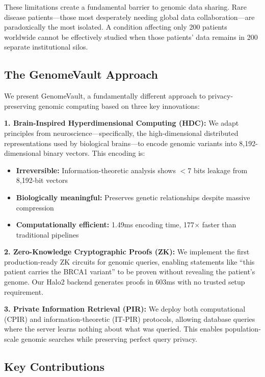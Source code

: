 \documentclass[11pt,a4paper]{article}
\begin{document}
These limitations create a fundamental barrier to genomic data sharing. Rare disease patients—those most desperately needing global data collaboration—are paradoxically the most isolated. A condition affecting only 200 patients worldwide cannot be effectively studied when those patients' data remains in 200 separate institutional silos.

\subsection{The GenomeVault Approach}

We present GenomeVault, a fundamentally different approach to privacy-preserving genomic computing based on three key innovations:

\textbf{1. Brain-Inspired Hyperdimensional Computing (HDC):} We adapt principles from neuroscience—specifically, the high-dimensional distributed representations used by biological brains—to encode genomic variants into 8,192-dimensional binary vectors. This encoding is:
\begin{itemize}
    \item \textbf{Irreversible:} Information-theoretic analysis shows $<$7 bits leakage from 8,192-bit vectors
    \item \textbf{Biologically meaningful:} Preserves genetic relationships despite massive compression
    \item \textbf{Computationally efficient:} 1.49ms encoding time, 177$\times$ faster than traditional pipelines
\end{itemize}

\textbf{2. Zero-Knowledge Cryptographic Proofs (ZK):} We implement the first production-ready ZK circuits for genomic queries, enabling statements like ``this patient carries the BRCA1 variant'' to be proven without revealing the patient's genome. Our Halo2 backend generates proofs in 603ms with no trusted setup requirement.

\textbf{3. Private Information Retrieval (PIR):} We deploy both computational (CPIR) and information-theoretic (IT-PIR) protocols, allowing database queries where the server learns nothing about what was queried. This enables population-scale genomic searches while preserving perfect query privacy.

\subsection{Key Contributions}
\end{document}
